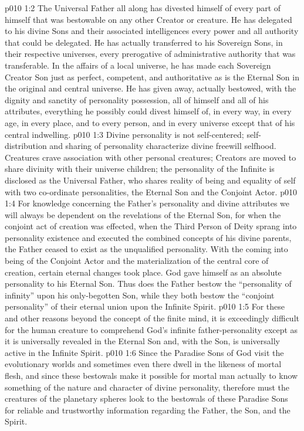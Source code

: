 \vs p010 1:2 The Universal Father all along has divested himself of every part of himself that was bestowable on any other Creator or creature. He has delegated to his divine Sons and their associated intelligences every power and all authority that could be delegated. He has actually transferred to his Sovereign Sons, in their respective universes, every prerogative of administrative authority that was transferable. In the affairs of a local universe, he has made each Sovereign Creator Son just as perfect, competent, and authoritative as is the Eternal Son in the original and central universe. He has given away, actually bestowed, with the dignity and sanctity of personality possession, all of himself and all of his attributes, everything he possibly could divest himself of, in every way, in every age, in every place, and to every person, and in every universe except that of his central indwelling.
\vs p010 1:3 \pc Divine personality is not self\hyp{}centered; self\hyp{}distribution and sharing of personality characterize divine freewill selfhood. Creatures crave association with other personal creatures; Creators are moved to share divinity with their universe children; the personality of the Infinite is disclosed as the Universal Father, who shares reality of being and equality of self with two co\hyp{}ordinate personalities, the Eternal Son and the Conjoint Actor.
\vs p010 1:4 \pc For knowledge concerning the Father’s personality and divine attributes we will always be dependent on the revelations of the Eternal Son, for when the conjoint act of creation was effected, when the Third Person of Deity sprang into personality existence and executed the combined concepts of his divine parents, the Father ceased to exist as the unqualified personality. With the coming into being of the Conjoint Actor and the materialization of the central core of creation, certain eternal changes took place. God gave himself as an absolute personality to his Eternal Son. Thus does the Father bestow the “personality of infinity” upon his only\hyp{}begotten Son, while they both bestow the “conjoint personality” of their eternal union upon the Infinite Spirit.
\vs p010 1:5 For these and other reasons beyond the concept of the finite mind, it is exceedingly difficult for the human creature to comprehend God’s infinite father\hyp{}personality except as it is universally revealed in the Eternal Son and, with the Son, is universally active in the Infinite Spirit.
\vs p010 1:6 Since the Paradise Sons of God visit the evolutionary worlds and sometimes even there dwell in the likeness of mortal flesh, and since these bestowals make it possible for mortal man actually to know something of the nature and character of divine personality, therefore must the creatures of the planetary spheres look to the bestowals of these Paradise Sons for reliable and trustworthy information regarding the Father, the Son, and the Spirit.
